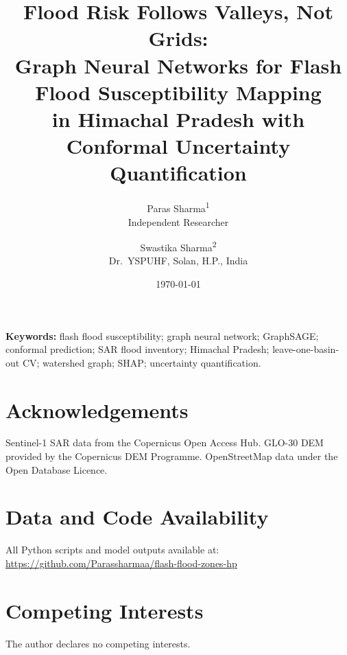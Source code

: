 \documentclass[11pt, a4paper]{article}
\title{Flood Risk Follows Valleys, Not Grids:\\[4pt]
  \large Graph Neural Networks for Flash Flood Susceptibility Mapping\\
  in Himachal Pradesh with Conformal Uncertainty Quantification
}
\author{%
  \normalsize Paras Sharma\textsuperscript{1}\\[2pt]
  \small Independent Researcher
  \and
  \normalsize Swastika Sharma\textsuperscript{2}\\[2pt]
  \small Dr.\ YSPUHF, Solan, H.P., India
}
\date{\small\today}
\begin{document}
\maketitle

\begin{abstract}

\end{abstract}

\noindent\textbf{Keywords:} flash flood susceptibility; graph neural network; GraphSAGE;
conformal prediction; SAR flood inventory; Himachal Pradesh; leave-one-basin-out CV;
watershed graph; SHAP; uncertainty quantification.








\section*{Acknowledgements}
Sentinel-1 SAR data from the Copernicus Open Access Hub.
GLO-30 DEM provided by the Copernicus DEM Programme.
OpenStreetMap data under the Open Database Licence.

\section*{Data and Code Availability}
All Python scripts and model outputs available at:
\url{https://github.com/Parassharmaa/flash-flood-zones-hp}

\section*{Competing Interests}
The author declares no competing interests.


\end{document}
